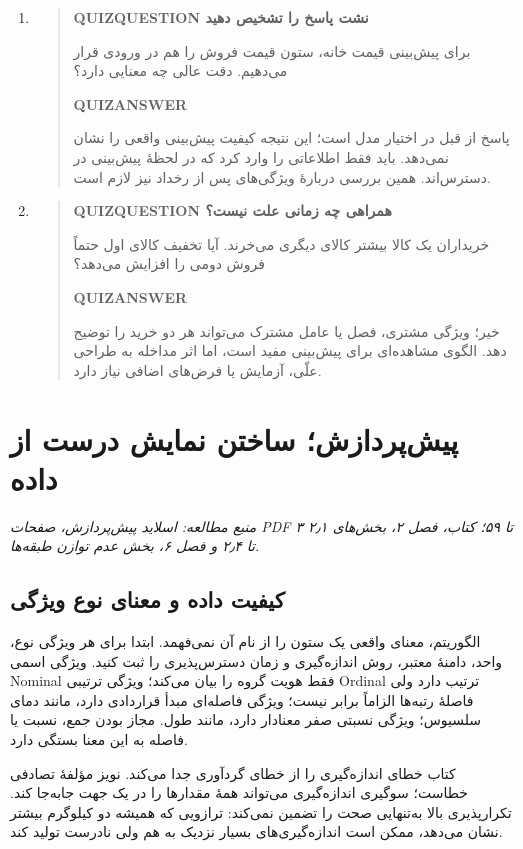 \begin{enumerate}
\begin{quote}
\end{quote}
\item\begin{quote}\textbf{QUIZQUESTION نشت پاسخ را تشخیص دهید}\par 
برای پیش‌بینی قیمت خانه، ستون قیمت فروش را هم در ورودی قرار می‌دهیم. دقت عالی چه معنایی دارد؟
\par\textbf{QUIZANSWER}\par پاسخ از قبل در اختیار مدل است؛ این نتیجه کیفیت پیش‌بینی واقعی را نشان نمی‌دهد. باید فقط اطلاعاتی را وارد کرد که در لحظهٔ پیش‌بینی در دسترس‌اند. همین بررسی دربارهٔ ویژگی‌های پس از رخداد نیز لازم است.\par 
\end{quote}
\item\begin{quote}\textbf{QUIZQUESTION همراهی چه زمانی علت نیست؟}\par 
خریداران یک کالا بیشتر کالای دیگری می‌خرند. آیا تخفیف کالای اول حتماً فروش دومی را افزایش می‌دهد؟
\par\textbf{QUIZANSWER}\par خیر؛ ویژگی مشتری، فصل یا عامل مشترک می‌تواند هر دو خرید را توضیح دهد. الگوی مشاهده‌ای برای پیش‌بینی مفید است، اما اثر مداخله به طراحی علّی، آزمایش یا فرض‌های اضافی نیاز دارد.\par 
\end{quote}
\end{enumerate}


\chapter{پیش‌پردازش؛ ساختن نمایش درست از داده}
\textit{منبع مطالعه: اسلاید پیش‌پردازش، صفحات PDF ۳ تا ۵۹؛ کتاب، فصل ۲، بخش‌های ۲٫۱ تا ۲٫۴ و فصل ۶، بخش عدم توازن طبقه‌ها.}\par 

\section{کیفیت داده و معنای نوع ویژگی}
الگوریتم، معنای واقعی یک ستون را از نام آن نمی‌فهمد. ابتدا برای هر ویژگی نوع، واحد، دامنهٔ معتبر، روش اندازه‌گیری و زمان دسترس‌پذیری را ثبت کنید. ویژگی اسمی Nominal فقط هویت گروه را بیان می‌کند؛ ویژگی ترتیبی Ordinal ترتیب دارد ولی فاصلهٔ رتبه‌ها الزاماً برابر نیست؛ ویژگی فاصله‌ای مبدأ قراردادی دارد، مانند دمای سلسیوس؛ ویژگی نسبتی صفر معنادار دارد، مانند طول. مجاز بودن جمع، نسبت یا فاصله به این معنا بستگی دارد.

کتاب خطای اندازه‌گیری را از خطای گردآوری جدا می‌کند. نویز مؤلفهٔ تصادفی خطاست؛ سوگیری اندازه‌گیری می‌تواند همهٔ مقدارها را در یک جهت جابه‌جا کند. تکرارپذیری بالا به‌تنهایی صحت را تضمین نمی‌کند: ترازویی که همیشه دو کیلوگرم بیشتر نشان می‌دهد، ممکن است اندازه‌گیری‌های بسیار نزدیک به هم ولی نادرست تولید کند.

